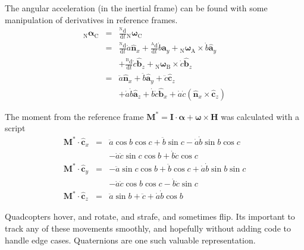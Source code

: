\documentclass[lettersize,journal]{IEEEtran}
\begin{document}
The angular acceleration (in the inertial frame) can be found with some manipulation of derivatives in reference frames.
\begin{eqnarray}
  {_\mathrm{N}\boldsymbol\alpha_\mathrm{C}} &=& \frac{^\mathrm{N}\mathrm{d}}{\mathrm{d}t} {_\mathrm{N}\boldsymbol\omega_\mathrm{C}} \nonumber\\
  &=& \frac{^\mathrm{N}\mathrm{d}}{\mathrm{d}t} \dot{a} \mathbf{\hat{n}}_x + \frac{^\mathrm{A}\mathrm{d}}{\mathrm{d}t} \dot{b} \mathbf{a}_y + {_\mathrm{N}\boldsymbol\omega_\mathrm{A}} \times \dot{b} \mathbf{\hat{a}}_y\nonumber\\
  && + \frac{^\mathrm{B}\mathrm{d}}{\mathrm{d} t} \dot{c} \mathbf{\hat{b}}_z + {_\mathrm{N}\boldsymbol\omega_\mathrm{B}} \times \dot{c} \mathbf{\hat{b}}_z \nonumber\\
  &=& \ddot{a}\mathbf{\hat{n}}_x + \ddot{b} \mathbf{\hat{a}}_y + \ddot{c} \mathbf{\hat{c}}_z\nonumber\\
  &&+\dot{a}\dot{b}\mathbf{\hat{a}}_z + \dot{b}\dot{c} \mathbf{\hat{b}}_x + \dot{a}\dot{c} \left(\mathbf{\hat{n}}_x \times \mathbf{\hat{c}}_z\right) 
\end{eqnarray}

The moment from the reference frame $\mathbf{M}^* = \mathbf{I}\cdot \boldsymbol\alpha + \boldsymbol\omega\times \mathbf{H}$ was calculated with a script
\begin{eqnarray}
  \mathbf{M}^* \cdot \mathbf{\hat{c}}_x &=& \ddot{a}\cos b\cos c + \ddot{b}\sin c- \dot{a}\dot{b}\sin b\cos c\nonumber\\
  &&- \dot{a}\dot{c}\sin c\cos b + \dot{b}\dot{c}\cos c\\
  \mathbf{M}^* \cdot \mathbf{\hat{c}}_y &=& - \ddot{a}\sin c\cos b + \ddot{b}\cos c+\dot{a}\dot{b}\sin b\sin c\nonumber\\
  &&- \dot{a}\dot{c}\cos b\cos c - \dot{b}\dot{c}\sin c \\
  \mathbf{M}^* \cdot \mathbf{\hat{c}}_z &=& \ddot{a} \sin b + \ddot{c} +\dot{a} \dot{b} \cos b
\end{eqnarray}




{
Quadcopters hover, and rotate, and strafe, and sometimes flip.
Its important to track any of these movements smoothly, and hopefully without adding code to handle edge cases.
Quaternions are one such valuable representation.
}
\end{document}
